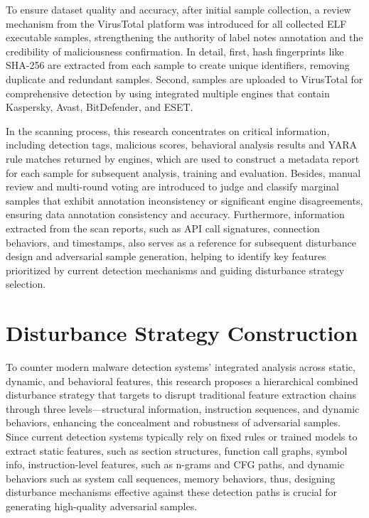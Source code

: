 To ensure dataset quality and accuracy, after initial sample collection, a review mechanism from the VirusTotal\cite{VirusTotal} platform was introduced for all collected ELF executable samples, strengthening the authority of label notes annotation and the credibility of maliciousness confirmation. In detail, first, hash fingerprints like SHA-256 are extracted from each sample to create unique identifiers, removing duplicate and redundant samples. Second, samples are uploaded to VirusTotal for comprehensive detection by using integrated multiple engines that contain Kaspersky, Avast, BitDefender, and ESET. 

In the scanning process, this research concentrates on critical information, including detection tags, malicious scores, behavioral analysis results and YARA rule matches returned by engines, which are used to construct a metadata report for each sample for subsequent analysis, training and evaluation. Besides, manual review and multi-round voting are introduced to judge and classify marginal samples that exhibit annotation inconsistency or significant engine disagreements, ensuring data annotation consistency and accuracy. Furthermore, information extracted from the scan reports, such as API call signatures, connection behaviors, and timestamps, also serves as a reference for subsequent disturbance design and adversarial sample generation, helping to identify key features prioritized by current detection mechanisms and guiding disturbance strategy selection.


\section{Disturbance Strategy Construction}

To counter modern malware detection systems' integrated analysis across static, dynamic, and behavioral features, this research proposes a hierarchical combined disturbance strategy that targets to disrupt traditional feature extraction chains through three levels—structural information, instruction sequences, and dynamic behaviors, enhancing the concealment and robustness of adversarial samples. Since current detection systems typically rely on fixed rules or trained models to extract static features, such as section structures, function call graphs, symbol info, instruction-level features, such as n-grams and CFG paths, and dynamic behaviors such as system call sequences, memory behaviors, thus, designing disturbance mechanisms effective against these detection paths is crucial for generating high-quality adversarial samples.

